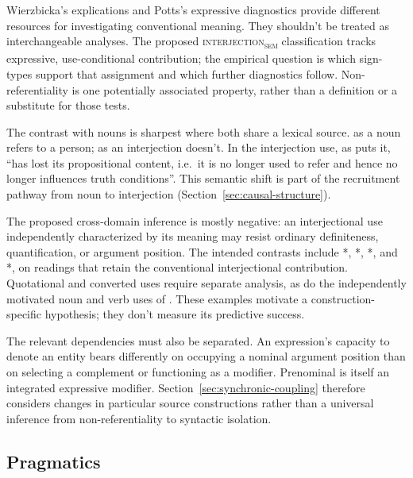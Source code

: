 \documentclass[12pt]{article}
\newcommand{\intj}[1]{\textsc{interjection\textsubscript{#1}}}
\begin{document}
Wierzbicka's explications and Potts's expressive diagnostics provide different resources for investigating conventional meaning. They shouldn't be treated as interchangeable analyses. The proposed \intj{sem} classification tracks expressive, use-conditional contribution; the empirical question is which sign-types support that assignment and which further diagnostics follow. Non-referentiality is one potentially associated property, rather than a definition or a substitute for those tests.

The contrast with nouns is sharpest where both share a lexical source.  as a noun refers to a person;  as an interjection doesn't. In the interjection use, as \textcite[88]{gehweiler2008} puts it,  \enquote{has lost its propositional content, i.e.\ it is no longer used to refer and hence no longer influences truth conditions}. This semantic shift is part of the recruitment pathway from noun to interjection (Section~\ref{sec:causal-structure}).

The proposed cross-domain inference is mostly negative: an interjectional use independently characterized by its meaning may resist ordinary definiteness, quantification, or argument position. The intended contrasts include *, *, *, and *, on readings that retain the conventional interjectional contribution. Quotational and converted uses require separate analysis, as do the independently motivated noun and verb uses of . These examples motivate a construction-specific hypothesis; they don't measure its predictive success.

The relevant dependencies must also be separated. An expression's capacity to denote an entity bears differently on occupying a nominal argument position than on selecting a complement or functioning as a modifier. Prenominal  is itself an integrated expressive modifier. Section~\ref{sec:synchronic-coupling} therefore considers changes in particular source constructions rather than a universal inference from non-referentiality to syntactic isolation.

\subsection{Pragmatics}\label{sec:pragmatics}
\end{document}
